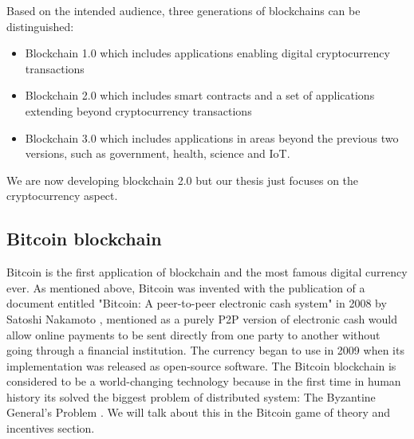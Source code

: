 

Based on the intended audience, three generations of blockchains can be distinguished:
\begin{itemize}

  \item Blockchain 1.0 which includes applications enabling digital cryptocurrency transactions
  \item Blockchain 2.0 which includes smart contracts and a set of applications extending beyond cryptocurrency transactions
  \item Blockchain 3.0 which includes applications in areas beyond the previous two versions, such as government, health, science and IoT.

\end{itemize}

We are now developing blockchain 2.0 but our thesis just focuses on the cryptocurrency aspect.


\subsection{Bitcoin blockchain}
Bitcoin is the first application of blockchain and the most famous digital currency ever.
As mentioned above, Bitcoin was invented with the publication of a document entitled "Bitcoin: A peer-to-peer electronic cash system" in 2008 by Satoshi Nakamoto \cite{Bitcoin}, mentioned as a purely P2P version of electronic cash would allow online payments to be sent directly from one party to another without going through a financial institution.
The currency began to use in 2009 when its implementation was released as open-source software.
The Bitcoin blockchain is considered to be a world-changing technology because in the first time in human history its solved the biggest problem of distributed system: The Byzantine General's Problem \cite{DBLP:journals/toplas/LamportSP82}.
We will talk about this in the Bitcoin game of theory and incentives section.

